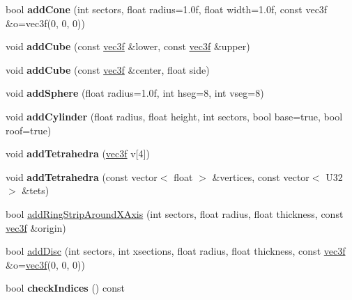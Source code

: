 \begin{DoxyCompactItemize}
\item 
\hypertarget{classps_1_1scene_1_1Geometry_ad13940852a3241a186c3bdaaa230d0f7}{}bool {\bfseries add\+Cone} (int sectors, float radius=1.\+0f, float width=1.\+0f, const vec3f \&o=vec3f(0, 0, 0))\label{classps_1_1scene_1_1Geometry_ad13940852a3241a186c3bdaaa230d0f7}

\item 
\hypertarget{classps_1_1scene_1_1Geometry_a76be3b4e69cc804537919b0c1fde78b7}{}void {\bfseries add\+Cube} (const \hyperlink{classps_1_1base_1_1Vec3}{vec3f} \&lower, const \hyperlink{classps_1_1base_1_1Vec3}{vec3f} \&upper)\label{classps_1_1scene_1_1Geometry_a76be3b4e69cc804537919b0c1fde78b7}

\item 
\hypertarget{classps_1_1scene_1_1Geometry_ae91b7f0e9dbacf75a155dd22243d5475}{}void {\bfseries add\+Cube} (const \hyperlink{classps_1_1base_1_1Vec3}{vec3f} \&center, float side)\label{classps_1_1scene_1_1Geometry_ae91b7f0e9dbacf75a155dd22243d5475}

\item 
\hypertarget{classps_1_1scene_1_1Geometry_ab75767952a0dca9d0161882ebd642d75}{}void {\bfseries add\+Sphere} (float radius=1.\+0f, int hseg=8, int vseg=8)\label{classps_1_1scene_1_1Geometry_ab75767952a0dca9d0161882ebd642d75}

\item 
\hypertarget{classps_1_1scene_1_1Geometry_a68187bda9650b5f12a50404300dbc85a}{}void {\bfseries add\+Cylinder} (float radius, float height, int sectors, bool base=true, bool roof=true)\label{classps_1_1scene_1_1Geometry_a68187bda9650b5f12a50404300dbc85a}

\item 
\hypertarget{classps_1_1scene_1_1Geometry_a18786c70964eb9533aabea2ce2002db9}{}void {\bfseries add\+Tetrahedra} (\hyperlink{classps_1_1base_1_1Vec3}{vec3f} v\mbox{[}4\mbox{]})\label{classps_1_1scene_1_1Geometry_a18786c70964eb9533aabea2ce2002db9}

\item 
\hypertarget{classps_1_1scene_1_1Geometry_af5ca854d61987b909706795e80c6d354}{}void {\bfseries add\+Tetrahedra} (const vector$<$ float $>$ \&vertices, const vector$<$ U32 $>$ \&tets)\label{classps_1_1scene_1_1Geometry_af5ca854d61987b909706795e80c6d354}

\item 
bool \hyperlink{classps_1_1scene_1_1Geometry_ac43ea1de489b810baf386094f1900324}{add\+Ring\+Strip\+Around\+X\+Axis} (int sectors, float radius, float thickness, const \hyperlink{classps_1_1base_1_1Vec3}{vec3f} \&origin)
\item 
bool \hyperlink{classps_1_1scene_1_1Geometry_af87d017d6d893342c956c9757100b4b4}{add\+Disc} (int sectors, int xsections, float radius, float thickness, const \hyperlink{classps_1_1base_1_1Vec3}{vec3f} \&o=\hyperlink{classps_1_1base_1_1Vec3}{vec3f}(0, 0, 0))
\item 
\hypertarget{classps_1_1scene_1_1Geometry_a789daa85947087c0f18c3cc1bf3f9b44}{}bool {\bfseries check\+Indices} () const \label{classps_1_1scene_1_1Geometry_a789daa85947087c0f18c3cc1bf3f9b44}


\end{DoxyCompactItemize}
